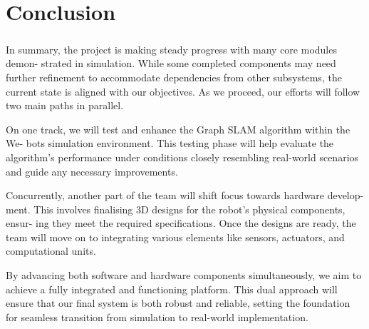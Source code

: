 \chapter{Conclusion}

\paragraph*{}
In summary, the project is making steady progress with many core modules demon-
strated in simulation. While some completed components may need further refinement
to accommodate dependencies from other subsystems, the current state is aligned with
our objectives. As we proceed, our efforts will follow two main paths in parallel.

On one track, we will test and enhance the Graph SLAM algorithm within the We-
bots simulation environment. This testing phase will help evaluate the algorithm’s
performance under conditions closely resembling real-world scenarios and guide any
necessary improvements.

Concurrently, another part of the team will shift focus towards hardware develop-
ment. This involves finalising 3D designs for the robot’s physical components, ensur-
ing they meet the required specifications. Once the designs are ready, the team will
move on to integrating various elements like sensors, actuators, and computational
units.

By advancing both software and hardware components simultaneously, we aim to
achieve a fully integrated and functioning platform. This dual approach will ensure
that our final system is both robust and reliable, setting the foundation for seamless
transition from simulation to real-world implementation.